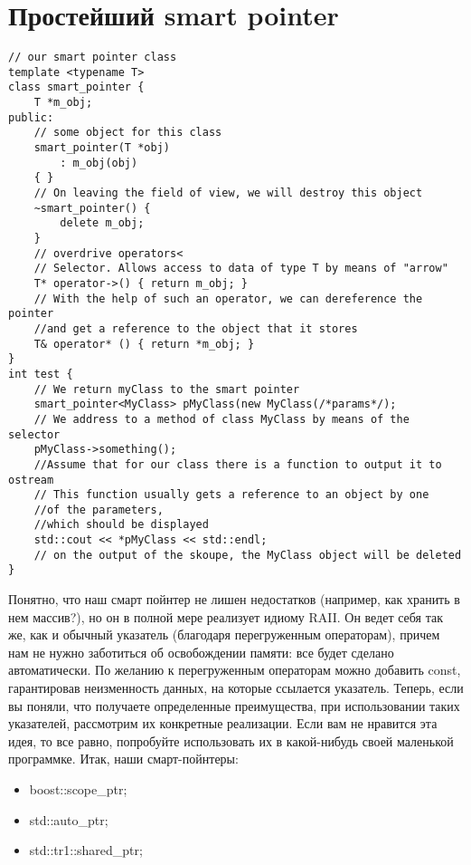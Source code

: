 \documentclass {article}
\begin{document}
\section{Простейший smart pointer}
\begin{lstlisting}[caption=Пример]
// our smart pointer class
template <typename T>
class smart_pointer {
    T *m_obj;
public:
    // some object for this class
    smart_pointer(T *obj)
        : m_obj(obj)
    { }
    // On leaving the field of view, we will destroy this object
    ~smart_pointer() {
        delete m_obj;
    }
    // overdrive operators<
    // Selector. Allows access to data of type T by means of "arrow"
    T* operator->() { return m_obj; }
    // With the help of such an operator, we can dereference the pointer
    //and get a reference to the object that it stores
    T& operator* () { return *m_obj; }
}
int test {
    // We return myClass to the smart pointer
    smart_pointer<MyClass> pMyClass(new MyClass(/*params*/);    
    // We address to a method of class MyClass by means of the selector
    pMyClass->something();  
    //Assume that for our class there is a function to output it to ostream
    // This function usually gets a reference to an object by one 
    //of the parameters,
    //which should be displayed
    std::cout << *pMyClass << std::endl;    
    // on the output of the skoupe, the MyClass object will be deleted
}
\end{lstlisting}
Понятно, что наш смарт пойнтер не лишен недостатков (например, как хранить в нем массив?), но он в полной мере реализует идиому RAII. Он ведет себя так же, как и обычный указатель (благодаря перегруженным операторам), причем нам не нужно заботиться об освобождении памяти: все будет сделано автоматически. По желанию к перегруженным операторам можно добавить const, гарантировав неизменность данных, на которые ссылается указатель.
Теперь, если вы поняли, что получаете определенные преимущества, при использовании таких указателей, рассмотрим их конкретные реализации. Если вам не нравится эта идея, то все равно, попробуйте использовать их в какой-нибудь своей маленькой программке.
Итак, наши смарт-пойнтеры:
\begin{itemize}
\item boost::scope\_ptr;
\item std::auto\_ptr;
\item std::tr1::shared\_ptr;
\end{itemize}
\end{document}
